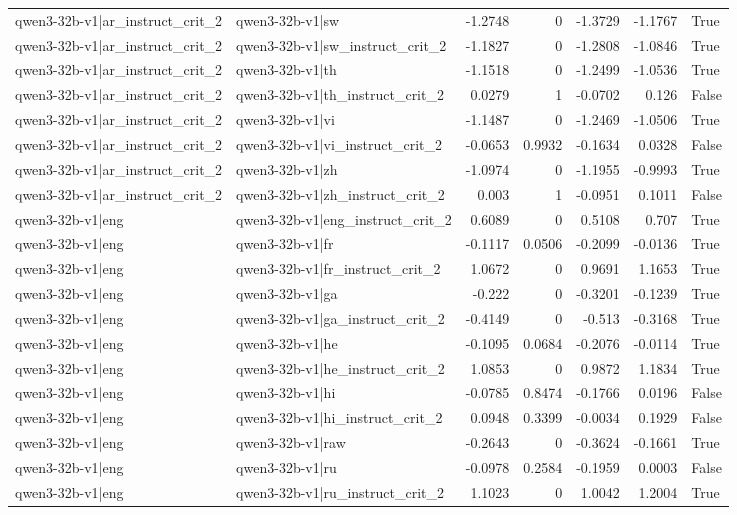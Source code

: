\begin{table}
\begin{tabular}{l l r r r r l}
qwen3-32b-v1|ar_instruct_crit_2 & qwen3-32b-v1|sw & -1.2748 & 0 & -1.3729 & -1.1767 & True \\
qwen3-32b-v1|ar_instruct_crit_2 & qwen3-32b-v1|sw_instruct_crit_2 & -1.1827 & 0 & -1.2808 & -1.0846 & True \\
qwen3-32b-v1|ar_instruct_crit_2 & qwen3-32b-v1|th & -1.1518 & 0 & -1.2499 & -1.0536 & True \\
qwen3-32b-v1|ar_instruct_crit_2 & qwen3-32b-v1|th_instruct_crit_2 & 0.0279 & 1 & -0.0702 & 0.126 & False \\
qwen3-32b-v1|ar_instruct_crit_2 & qwen3-32b-v1|vi & -1.1487 & 0 & -1.2469 & -1.0506 & True \\
qwen3-32b-v1|ar_instruct_crit_2 & qwen3-32b-v1|vi_instruct_crit_2 & -0.0653 & 0.9932 & -0.1634 & 0.0328 & False \\
qwen3-32b-v1|ar_instruct_crit_2 & qwen3-32b-v1|zh & -1.0974 & 0 & -1.1955 & -0.9993 & True \\
qwen3-32b-v1|ar_instruct_crit_2 & qwen3-32b-v1|zh_instruct_crit_2 & 0.003 & 1 & -0.0951 & 0.1011 & False \\
qwen3-32b-v1|eng & qwen3-32b-v1|eng_instruct_crit_2 & 0.6089 & 0 & 0.5108 & 0.707 & True \\
qwen3-32b-v1|eng & qwen3-32b-v1|fr & -0.1117 & 0.0506 & -0.2099 & -0.0136 & True \\
qwen3-32b-v1|eng & qwen3-32b-v1|fr_instruct_crit_2 & 1.0672 & 0 & 0.9691 & 1.1653 & True \\
qwen3-32b-v1|eng & qwen3-32b-v1|ga & -0.222 & 0 & -0.3201 & -0.1239 & True \\
qwen3-32b-v1|eng & qwen3-32b-v1|ga_instruct_crit_2 & -0.4149 & 0 & -0.513 & -0.3168 & True \\
qwen3-32b-v1|eng & qwen3-32b-v1|he & -0.1095 & 0.0684 & -0.2076 & -0.0114 & True \\
qwen3-32b-v1|eng & qwen3-32b-v1|he_instruct_crit_2 & 1.0853 & 0 & 0.9872 & 1.1834 & True \\
qwen3-32b-v1|eng & qwen3-32b-v1|hi & -0.0785 & 0.8474 & -0.1766 & 0.0196 & False \\
qwen3-32b-v1|eng & qwen3-32b-v1|hi_instruct_crit_2 & 0.0948 & 0.3399 & -0.0034 & 0.1929 & False \\
qwen3-32b-v1|eng & qwen3-32b-v1|raw & -0.2643 & 0 & -0.3624 & -0.1661 & True \\
qwen3-32b-v1|eng & qwen3-32b-v1|ru & -0.0978 & 0.2584 & -0.1959 & 0.0003 & False \\
qwen3-32b-v1|eng & qwen3-32b-v1|ru_instruct_crit_2 & 1.1023 & 0 & 1.0042 & 1.2004 & True \\

\end{tabular}
\end{table}
